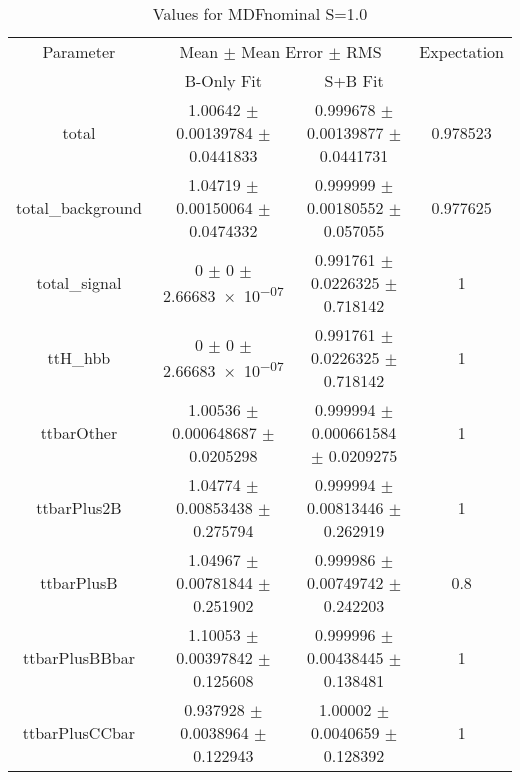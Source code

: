 \begin{table}
\centering
\caption{Values for MDFnominal S=1.0}
\begin{tabular}{cccc}
\toprule
Parameter & \multicolumn{2}{c}{Mean $\pm$ Mean Error $\pm$ RMS} & Expectation\\
 & B-Only Fit & S+B Fit & \\
\midrule
total & \num{1.00642} $\pm$ \num{0.00139784} $\pm$ \num{0.0441833} & \num{0.999678} $\pm$ \num{0.00139877} $\pm$ \num{0.0441731} & \num{0.978523}\\
total\_background & \num{1.04719} $\pm$ \num{0.00150064} $\pm$ \num{0.0474332} & \num{0.999999} $\pm$ \num{0.00180552} $\pm$ \num{0.057055} & \num{0.977625}\\
total\_signal & \num{0} $\pm$ \num{0} $\pm$ \num{2.66683e-07} & \num{0.991761} $\pm$ \num{0.0226325} $\pm$ \num{0.718142} & \num{1}\\
ttH\_hbb & \num{0} $\pm$ \num{0} $\pm$ \num{2.66683e-07} & \num{0.991761} $\pm$ \num{0.0226325} $\pm$ \num{0.718142} & \num{1}\\
ttbarOther & \num{1.00536} $\pm$ \num{0.000648687} $\pm$ \num{0.0205298} & \num{0.999994} $\pm$ \num{0.000661584} $\pm$ \num{0.0209275} & \num{1}\\
ttbarPlus2B & \num{1.04774} $\pm$ \num{0.00853438} $\pm$ \num{0.275794} & \num{0.999994} $\pm$ \num{0.00813446} $\pm$ \num{0.262919} & \num{1}\\
ttbarPlusB & \num{1.04967} $\pm$ \num{0.00781844} $\pm$ \num{0.251902} & \num{0.999986} $\pm$ \num{0.00749742} $\pm$ \num{0.242203} & \num{0.8}\\
ttbarPlusBBbar & \num{1.10053} $\pm$ \num{0.00397842} $\pm$ \num{0.125608} & \num{0.999996} $\pm$ \num{0.00438445} $\pm$ \num{0.138481} & \num{1}\\
ttbarPlusCCbar & \num{0.937928} $\pm$ \num{0.0038964} $\pm$ \num{0.122943} & \num{1.00002} $\pm$ \num{0.0040659} $\pm$ \num{0.128392} & \num{1}\\
\bottomrule
\end{tabular}
\end{table}